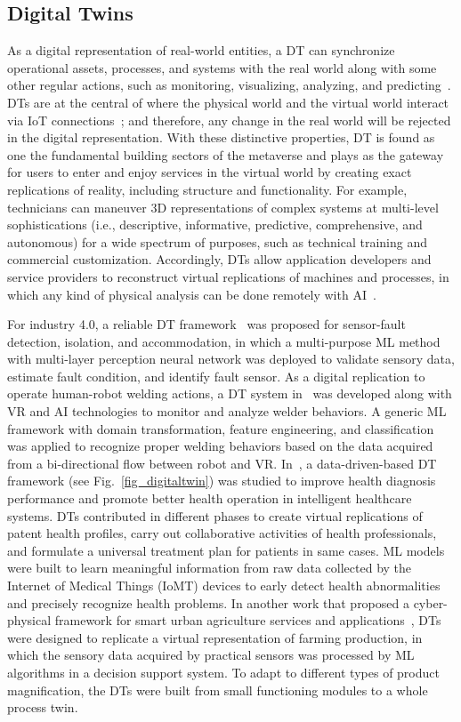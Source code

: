 \documentclass[journal]{IEEEtran}
\begin{document}
\subsection{Digital Twins}
As a digital representation of real-world entities, a DT can synchronize operational assets, processes, and systems with the real world along with some other regular actions, such as monitoring, visualizing, analyzing, and predicting~\cite{tao2019digital}. DTs are at the central of where the physical world and the virtual world interact via IoT connections~\cite{chen2021digital}; and therefore, any change in the real world will be rejected in the digital representation. With these distinctive properties, DT is found as one the fundamental building sectors of the metaverse and plays as the gateway for users to enter and enjoy services in the virtual world by creating exact replications of reality, including structure and functionality. For example, technicians can maneuver 3D representations of complex systems at multi-level sophistications (i.e., descriptive, informative, predictive, comprehensive, and autonomous) for a wide spectrum of purposes, such as technical training and commercial customization. Accordingly, DTs allow application developers and service providers to reconstruct virtual replications of machines and processes, in which any kind of physical analysis can be done remotely with AI~\cite{rathore2021therole}.

For industry 4.0, a reliable DT framework~\cite{darvishi2021sensor} was proposed for sensor-fault detection, isolation, and accommodation, in which a multi-purpose ML method with multi-layer perception neural network was deployed to validate sensory data, estimate fault condition, and identify fault sensor.  
As a digital replication to operate human-robot welding actions, a DT system in~\cite{wang2021digital} was developed along with VR and AI technologies to monitor and analyze welder behaviors. A generic ML framework with domain transformation, feature engineering, and classification was applied to recognize proper welding behaviors based on the data acquired from a bi-directional flow between robot and VR.
In~\cite{elayan2021digital}, a data-driven-based DT framework (see Fig.~\ref{fig_digitaltwin}) was studied to improve health diagnosis performance and promote better health operation in intelligent healthcare systems. DTs contributed in different phases to create virtual replications of patent health profiles, carry out collaborative activities of health professionals, and formulate a universal treatment plan for patients in same cases. ML models were built to learn meaningful information from raw data collected by the Internet of Medical Things (IoMT) devices to early detect health abnormalities and precisely recognize health problems. In another work that proposed a cyber-physical framework for smart urban agriculture services and applications~\cite{ghandar2021adecision}, DTs were designed to replicate a virtual representation of farming production, in which the sensory data acquired by practical sensors was processed by ML algorithms in a decision support system. To adapt to different types of product magnification, the DTs were built from small functioning modules to a whole process twin.
\end{document}
